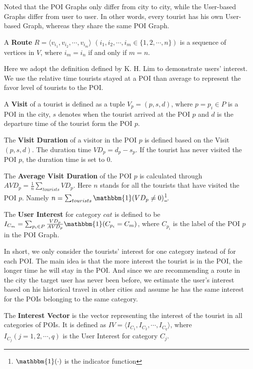 \documentclass[runningheads]{llncs}
\begin{document}
Noted that the POI Graphs only differ from city to city, while the User-based Graphs differ from user to user. In other words, every tourist has his own User-based Graph, whereas they share the same POI Graph.
\begin{definition}
	A \textbf{Route} $R=\langle v_{i_1},v_{i_2},\cdots,v_{i_m}\rangle$ $(i_1,i_2,\cdots,i_m\in \{1,2,\cdots,n\})$ is a sequence of vertices in $V$, where $i_m=i_n$ if and only if $m=n$.
\end{definition}

Here we adopt the definition defined by K. H. Lim\cite{lim2015personalized} to demonstrate users' interest. We use the relative time tourists stayed at a POI than average to represent the favor level of tourists to the POI.
\begin{definition}
	\label{def4}
	A \textbf{Visit} of a tourist is defined as a tuple $V_p=(p, s, d)$, where $p=p_i\in P$ is a POI in the city, $s$ denotes when the tourist arrived at the POI $p$ and $d$ is the departure time of the tourist form the POI $p$.
\end{definition}
\begin{definition}
	\label{def5}
	The \textbf{Visit Duration} of a visitor in the POI $p$ is defined based on the Visit $(p, s, d)$. The duration time $VD_p=d_p-s_p$. If the tourist has never visited the POI $p$, the duration time is set to $0$.
\end{definition}
\begin{definition}
	The \textbf{Average Visit Duration} of the POI $p$ is calculated through $AVD_p=\frac{1}{n}\sum_{tourists}VD_p$. Here $n$ stands for all the tourists that have visited the POI $p$. Namely $n=\sum_{tourists}\mathbbm{1}(VD_p\neq0)$\footnote{$\mathbbm{1}(\cdot)$ is the indicator function}.
\end{definition}
\begin{definition}
	The \textbf{User Interest} for category $cat$ is defined to be $I_{C_m}=\sum_{p_i\in P}\frac{VD_p}{AVD_p}\mathbbm{1}(C_{p_i}=C_m)$, where $C_{p_i}$ is the label of the POI $p$ in the POI Graph. 
\end{definition}

In short, we only consider the tourists' interest for one category instead of for each POI. The main idea is that the more interest the tourist is in the POI, the longer time he will stay in the POI. And since we are recommending a route in the city the target user has never been before, we estimate the user's interest based on his historical travel in other cities and assume he has the same interest for the POIs belonging to the same category.
\begin{definition}
	The \textbf{Interest Vector} is the vector representing the interest of the tourist in all categories of POIs. It is defined as $IV = \langle I_{C_1},I_{C_2},\cdots,I_{C_q}\rangle$, where $I_{C_j}(j=1,2,\cdots,q)$ is the User Interest for category $C_j$.
\end{definition}
\end{document}
